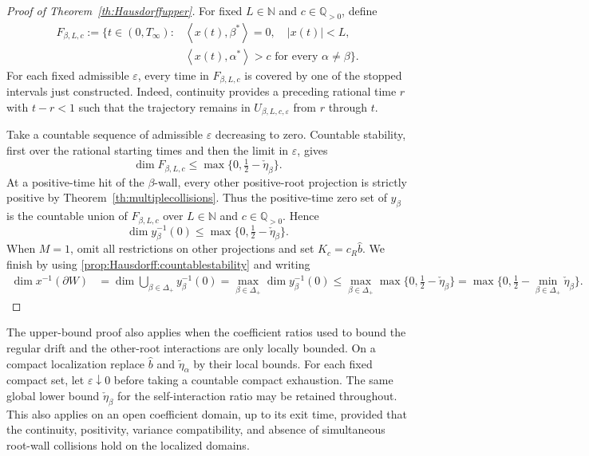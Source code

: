 \documentclass{article}
\numberwithin{equation}{section}
\newcommand{\N}{\mathbb{N}}
\newcommand{\C}{W}
\newcommand{\Cb}{\partial \C}
\newcommand{\xtas}{\left<x(t),\alpha^*\right>}
\newcommand{\xtbs}{\left<x(t),\beta^*\right>}
\newcommand{\SimplePlus}{\Delta_+}
\theoremstyle{plain}
\begin{document}
\begin{proof}[Proof of Theorem~\ref{th:Hausdorffupper}]
For fixed $L\in\N$ and $c\in\mathbb Q_{>0}$, define
\[
\begin{split}
 F_{\beta,L,c}:=\{t\in(0,T_\infty):
 &\xtbs =0,\quad |x(t)|<L,\\
 &\xtas>c\text{ for every }\alpha\ne\beta\}.
\end{split}
\]
For each fixed admissible $\varepsilon$, every time in $F_{\beta,L,c}$ is covered by one of the stopped intervals just constructed. Indeed, continuity provides a preceding rational time $r$ with $t-r<1$ such that the trajectory remains in $U_{\beta,L,c,\varepsilon}$ from $r$ through $t$.

Take a countable sequence of admissible $\varepsilon$ decreasing to zero. Countable stability, first over the rational starting times and then the limit in $\varepsilon$, gives
\[
 \dim F_{\beta,L,c}\leq
 \max\{0,\tfrac12-\check\eta_\beta\}.
\]
At a positive-time hit of the $\beta$-wall, every other positive-root projection is strictly positive by Theorem~\eqref{th:multiplecollisions}. Thus the positive-time zero set of $y_\beta$ is the countable union of $F_{\beta,L,c}$ over $L\in\N$ and $c\in\mathbb Q_{>0}$. Hence
\[
 \dim y_\beta^{-1}(0)\leq
 \max\{0,\tfrac12-\check\eta_\beta\}.
\]
When $M=1$, omit all restrictions on other projections and set $K_c=c_R\hat b$.
        We finish by using \ref{prop:Hausdorff:countablestability} and writing
        \begin{align*}
          \dim x^{-1}(\Cb)&= \dim \bigcup_{\beta\in\SimplePlus}y_\beta^{-1}(0)=\max_{\beta\in\SimplePlus}\dim y_\beta^{-1}(0)\leq \max_{\beta\in\SimplePlus} \max\bigg\{0,\frac12-\check{\eta}_\beta\bigg\}=\max\bigg\{0,\frac12-\min_{\beta\in\SimplePlus}\check{\eta}_\beta\bigg\}.
        \end{align*}
    \end{proof}
    The upper-bound proof also applies when the coefficient ratios used to bound the regular drift and the other-root interactions are only locally bounded. On a compact localization replace $\hat b$ and $\widetilde\eta_\alpha$ by their local bounds. For each fixed compact set, let $\varepsilon\downarrow0$ before taking a countable compact exhaustion. The same global lower bound $\check\eta_\beta$ for the self-interaction ratio may be retained throughout. This also applies on an open coefficient domain, up to its exit time, provided that the continuity, positivity, variance compatibility, and absence of simultaneous root-wall collisions hold on the localized domains.
\end{document}
